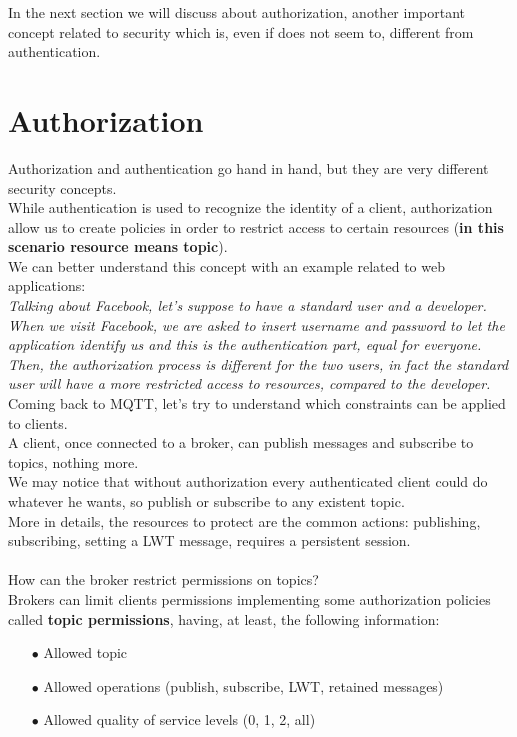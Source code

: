 \documentclass[12pt]{report}
\begin{document}
{In the next section we will discuss about authorization, another important concept related to security which is, even if does not seem to, different from authentication.\\


\section{Authorization}
\bigskip
Authorization and authentication go hand in hand, but they are very different security concepts.\\
While authentication is used to recognize the identity of a client, authorization allow us to create policies in order to restrict access to certain resources (\textbf{in this scenario resource means topic}).\\
We can better understand this concept with an example related to web applications:\\

\textit{Talking about Facebook, let's suppose to have a standard user and a developer.
When we visit Facebook, we are asked to insert username and password to let the application identify us and this is the authentication part, equal for everyone.
Then, the authorization process is different for the two users, in fact the standard user will have a more restricted access to resources, compared to the developer.}\\

Coming back to MQTT, let's try to understand which constraints can be applied to clients.\\
A client, once connected to a broker, can publish messages and subscribe to topics, nothing more.\\
We may notice that without authorization every authenticated client could do whatever he wants, so publish or subscribe to any existent topic.\\
More in details, the resources to protect are the common actions: publishing, subscribing, setting a LWT message, requires a persistent session.\\\\
How can the broker restrict permissions on topics?\\

Brokers can limit clients permissions implementing some authorization policies called \textbf{topic permissions}, having, at least, the following information:

\begin{itemize}
\setlength{\itemindent}{+4mm}
  \item[$\bullet$] Allowed topic
  \item[$\bullet$] Allowed operations (publish, subscribe, LWT, retained messages)
  \item[$\bullet$] Allowed quality of service levels (0, 1, 2, all)
\end{itemize}

}
\end{document}

